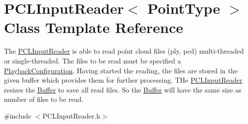 \hypertarget{class_p_c_l_input_reader}{}\section{P\+C\+L\+Input\+Reader$<$ Point\+Type $>$ Class Template Reference}
\label{class_p_c_l_input_reader}


The \hyperlink{class_p_c_l_input_reader}{P\+C\+L\+Input\+Reader} is able to read point cloud files (ply, pcd) multi-\/threaded or single-\/threaded. The files to be read must be specified a \hyperlink{class_playback_configuration}{Playback\+Configuration}. Having started the reading, the files are stored in the given buffer which provides them for further processing. T\+He \hyperlink{class_p_c_l_input_reader}{P\+C\+L\+Input\+Reader} resizes the \hyperlink{class_buffer}{Buffer} to save all read files. So the \hyperlink{class_buffer}{Buffer} will have the same size as number of files to be read.  




{\ttfamily \#include $<$P\+C\+L\+Input\+Reader.\+h$>$}

